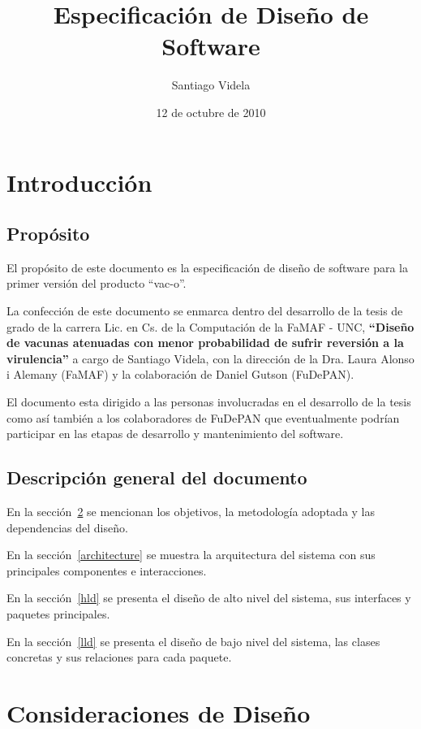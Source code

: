 \documentclass[a4paper,10pt]{article}
\author{Santiago Videla}
\title{Especificaci\'on de Dise\~no de Software}
\date{12 de octubre de 2010}
\begin{document}
\maketitle
\newpage
\tableofcontents
\newpage
\section{Introducci\'on}
  \subsection{Prop\'osito}

El prop\'osito de este documento es la especificaci\'on de
dise\~no de software para la primer versi\'on del producto ``vac-o''.

La confecci\'on de este documento se enmarca dentro del desarrollo de la tesis
de grado de la carrera Lic. en Cs. de la Computaci\'on de la FaMAF - UNC,
\textbf{``Dise\~no de vacunas atenuadas con menor probabilidad de sufrir
reversi\'on a la virulencia''} a cargo de Santiago Videla, con la direcci\'on
de la Dra. Laura Alonso i Alemany (FaMAF) y la colaboraci\'on de Daniel
Gutson (FuDePAN).

El documento esta dirigido a las personas involucradas en el desarrollo de la
tesis como as\'i tambi\'en a los colaboradores de FuDePAN que eventualmente
podr\'ian participar en las etapas de desarrollo y mantenimiento del software.

\subsection{Descripci\'on general del documento}

En la secci\'on~\ref{considerations} se mencionan los objetivos, la
metodolog\'ia adoptada y las dependencias del dise\~no.

En la secci\'on~\ref{architecture} se muestra la arquitectura del
sistema con sus principales componentes e interacciones.

En la secci\'on~\ref{hld} se presenta el dise\~no de alto nivel del sistema,
sus interfaces y paquetes principales.

En la secci\'on~\ref{lld} se presenta el dise\~no de bajo nivel del sistema,
las clases concretas y sus relaciones para cada paquete.

\section{Consideraciones de Dise\~no}
\label{considerations}
\end{document}

